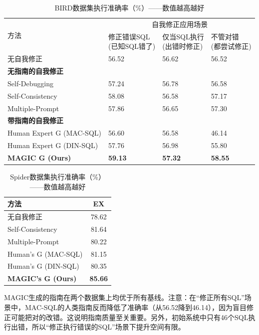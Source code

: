 \begin{table}[htbp]
\centering
\caption{BIRD数据集执行准确率（\%）——数值越高越好}
\label{tab:bird}
\begin{tabularx}{\textwidth}{l XXX}  %
\toprule
\multirow{2}{*}{方法} & \multicolumn{3}{c}{自我修正应用场景} \\
\cmidrule{2-4}
 & \makecell{修正错误SQL\\(已知SQL错了)} & \makecell{仅当SQL执行\\(出错时修正)} & \makecell{不管对错\\(都尝试修正)} \\
\midrule
无自我修正 & 56.52 & 56.62 & 56.52 \\
\midrule
\multicolumn{4}{l}{\textbf{无指南的自我修正}} \\
Self-Debugging    & 57.24 & 56.78 & 56.58 \\
Self-Consistency  & 58.08 & 56.58 & 57.17 \\
Multiple-Prompt   & 57.86 & 56.65 & 57.30 \\
\midrule
\multicolumn{4}{l}{\textbf{带指南的自我修正}} \\
Human Expert G (MAC-SQL) & 56.60 & 56.58 & 46.14 \\
Human Expert G (DIN-SQL) & 57.76 & 56.98 & 55.80 \\
\textbf{MAGIC G (Ours)}  & \textbf{59.13} & \textbf{57.32} & \textbf{58.55} \\
\bottomrule
\end{tabularx}
\end{table}

\begin{table}[htbp]
\centering
\caption{Spider数据集执行准确率（\%）——数值越高越好}
\label{tab:spider}
\begin{tabular}{lc}
\toprule
方法 & EX \\
\midrule
无自我修正 & 78.62 \\
Self-Consistency & 81.64 \\
Multiple-Prompt & 80.22 \\
Human's G (MAC-SQL) & 81.15 \\
Human's G (DIN-SQL) & 80.35 \\
\textbf{MAGIC's G (Ours)} & \textbf{85.66} \\
\bottomrule
\end{tabular}
\end{table}

MAGIC生成的指南在两个数据集上均优于所有基线。注意：在“修正所有SQL”场景中，MAC-SQL的人类指南反而降低了准确率（从56.52降到46.14），因为盲目修正可能把对的改错。这说明指南质量至关重要。另外，初始系统中只有46个SQL执行出错，所以“修正执行错误的SQL”场景下提升空间有限。

